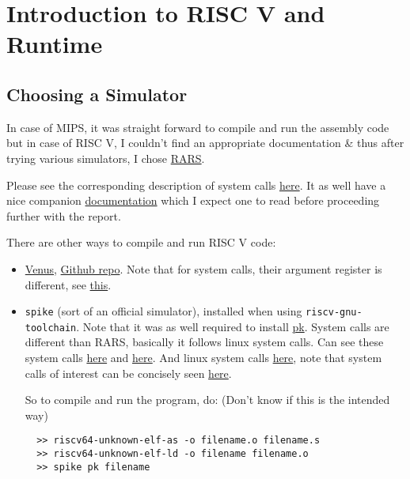 \chapter{Introduction to RISC V and Runtime}

\section{Choosing a Simulator}

In case of MIPS, it was straight forward to compile and run the assembly code but in case of RISC V, I couldn't find an appropriate documentation \& thus after trying various simulators, I chose \href{https://github.com/TheThirdOne/rars}{RARS}.

Please see the corresponding description of system calls \href{https://github.com/TheThirdOne/rars/wiki/Environment-Calls}{here}. It as well have a nice companion \href{https://github.com/TheThirdOne/rars/wiki}{documentation} which I expect one to read before proceeding further with the report.

There are other ways to compile and run RISC V code:

\begin{itemize}

	\item \href{http://www.kvakil.me/venus/}{Venus}, \href{https://github.com/kvakil/venus}{Github repo}. Note that for system calls, their argument register is different, see \href{https://github.com/TheThirdOne/rars/issues/45}{this}.

	\item \texttt{spike} (sort of an official simulator), installed when using \texttt{riscv-gnu-toolchain}. Note that it was as well required to install \href{https://github.com/riscv/riscv-pk}{pk}. System calls are different than RARS, basically it follows linux system calls. Can see these system calls \href{https://github.com/riscv/riscv-pk/blob/master/pk/syscall.c}{here} and \href{https://github.com/riscv/riscv-pk/blob/master/pk/syscall.h}{here}. And linux system calls \href{http://man7.org/linux/man-pages/man2/syscalls.2.html}{here}, note that system calls of interest can be concisely seen \href{https://rv8.io/syscalls.html}{here}.

	      So to compile and run the program, do: (Don't know if this is the intended way)

	      \begin{verbatim}
  >> riscv64-unknown-elf-as -o filename.o filename.s 
  >> riscv64-unknown-elf-ld -o filename filename.o 
  >> spike pk filename
  \end{verbatim}

\end{itemize}

